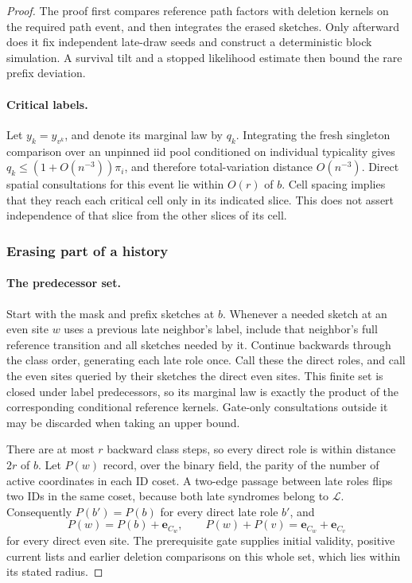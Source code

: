 \begin{proof}\leavevmode\par
The proof first compares reference path factors with deletion kernels on
the required path event, and then integrates the erased sketches. Only
afterward does it fix independent late-draw seeds and construct a
deterministic block simulation. A survival tilt and a stopped likelihood
estimate then bound the rare prefix deviation.

\paragraph{Critical labels.}
Let \(y_k=y_{v^k}\), and denote its marginal law by \(q_k\). Integrating
the fresh singleton comparison over an unpinned iid pool conditioned on
individual typicality gives
\(q_k\le(1+O(n^{-3}))\pi_i\), and therefore total-variation distance
\(O(n^{-3})\). Direct spatial consultations for this event lie within
\(O(r)\) of \(b\). Cell spacing implies that they reach each critical
cell only in its indicated slice. This does not assert independence of
that slice from the other slices of its cell.

\subsubsection{Erasing part of a history}
\label{sec:erasing-part-of-a-history}

\paragraph{The predecessor set.}
Start with the mask and prefix sketches at \(b\). Whenever a needed
sketch at an even site \(w\) uses a previous late neighbor's label,
include that neighbor's full reference transition and all sketches
needed by it. Continue backwards through the class order, generating
each late role once. Call these the direct roles, and call the even
sites queried by their sketches the direct even sites. This finite set
is closed under label predecessors, so its marginal law is exactly the
product of the corresponding conditional reference kernels. Gate-only
consultations outside it may be discarded when taking an upper bound.

There are at most \(r\) backward class steps, so every direct role is
within distance \(2r\) of \(b\). Let \(P(w)\) record, over the binary
field, the parity of the number of active coordinates in each ID coset.
A two-edge passage between late roles flips two IDs in the same coset,
because both late syndromes belong to \(\mathcal L\). Consequently
\(P(b')=P(b)\) for every direct late role \(b'\), and
\[
 P(w)=P(b)+\boldsymbol e_{C_w},\qquad
 P(w)+P(v)=\boldsymbol e_{C_w}+\boldsymbol e_{C_v}
\]
for every direct even site. The prerequisite gate supplies initial
validity, positive current lists and earlier deletion comparisons on
this whole set, which lies within its stated radius.


\end{proof}
